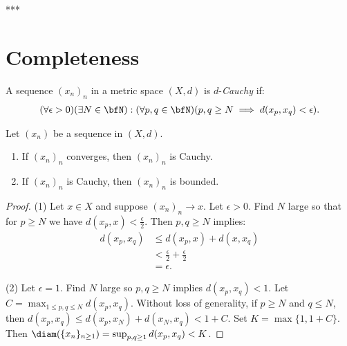     \begin{example}***
        
    \end{example}

\section{Completeness}
    \begin{definition}
        A sequence $(x_n)_n$ in a metric space $(X,d)$ is $d$-\textit{Cauchy} if:
            \begin{equation*}
            \begin{split}
                (\forall \epsilon > 0)(\exists N \in \bfN): (\forall p,q \in \bfN)(p,q \geq N \implies d(x_p,x_q) < \epsilon).
            \end{split}
            \end{equation*}
    \end{definition}

    \begin{proposition}
        Let $(x_n)$ be a sequence in $(X,d)$.
        \begin{enumerate}[label = (\arabic*),itemsep=1pt,topsep=3pt]
            \item If $(x_n)_n$ converges, then $(x_n)_n$ is Cauchy.
            \item If $(x_n)_n$ is Cauchy, then $(x_n)_n$ is bounded.
        \end{enumerate}
    \end{proposition}
        \begin{proof}
            (1) Let $x \in X$ and suppose $(x_n)_n \rightarrow x$. Let $\epsilon > 0$. Find $N$ large so that for $p \geq N$ we have $d(x_p,x) < \frac{\epsilon}{2}$. Then $p,q \geq N$ implies:
                \begin{equation*}
                \begin{split}
                    d(x_p,x_q) 
                    & \leq d(x_p,x) + d(x,x_q) \\
                    & < \frac{\epsilon}{2} + \frac{\epsilon}{2} \\
                    & = \epsilon.
                \end{split}
                \end{equation*}

            (2) Let $\epsilon = 1$. Find $N$ large so $p,q \geq N$ implies $d(x_p,x_q) < 1$. Let $C = \max_{1 \leq p,q \leq N}d(x_p,x_q)$. Without loss of generality, if $p \geq N $ and $q \leq N$, then $d(x_p,x_q) \leq d(x_p,x_N) + d(x_N,x_q) < 1 + C$. Set $K = \max\{1,1+C\}$. Then $\diam(\{x_n\}_{n \geq 1}) = \sup_{p,q \geq 1}d(x_p,x_q) < K$.
        \end{proof}

